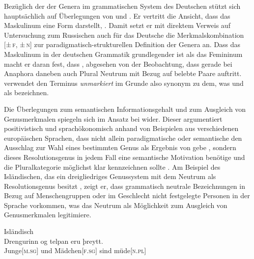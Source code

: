 \label{phsec:markiertheit}
Bezüglich der  der Genera im grammatischen
System des Deutschen stützt sich \citet{askedal1973}
hauptsächlich auf Überlegungen von \citet{jakobson1932} und
\citet{bierwisch1967}. Er vertritt die Ansicht, dass das Maskulinum eine
 Form darstellt,
. Damit setzt er mit
direktem Verweis auf  Untersuchung zum
Russischen auch für das Deutsche die Merkmalskombination
[\textsc{±\,f, ±\,n}] zur paradigmatisch-struk\-turellen
Definition der Genera an. Dass das Maskulinum in der deutschen Grammatik
grundlegender ist als das Femininum macht er daran fest, dass
, abgesehen von der Beobachtung, dass gerade
bei Anaphora daneben auch Plural Neutrum mit Bezug auf belebte
Paare auftritt. \citet{askedal1973} verwendet den Terminus \emph{unmarkiert} im
Grunde also synonym zu dem, was \citet[205--218]{corbett1991} und
\citet{wechsler2009} als  bezeichnen.

Die Überlegungen  zum semantischen Informationsgehalt
und zum Ausgleich von Genusmerkmalen spiegeln sich im Ansatz
bei \citet{corbett1991} wider. Dieser argumentiert positivistisch und
sprachökonomisch anhand von Beispielen aus verschiedenen europäischen Sprachen,
dass nicht allein paradigmatische oder semantische
 den Ausschlag zur Wahl eines bestimmten
Genus als Ergebnis von  gebe
\autocite[290--293]{corbett1991}, sondern dieses Resolutionsgenus in jedem Fall
eine semantische Motivation benötige und die
Plural\-kategorie möglichst klar kennzeichnen sollte
\autocite[293--299]{corbett1991}. Am Beispiel des Isländischen,
das ein dreigliedriges Genussystem mit dem Neutrum als
Resolutionsgenus besitzt , zeigt er,
dass grammatisch neutrale Bezeichnungen in Bezug auf Menschen\-gruppen oder im
Geschlecht nicht festgelegte Personen in der Sprache vorkommen, was das Neutrum
als Möglichkeit zum Ausgleich von Genusmerkmalen legiti\-miere.

\begin{exe}
\ex \label{ex:icelgendres}
	\langinfo%
		{Isländisch}%
		{}
		{\cites[nach][283]{corbett1991}[569]{wechsler2009}}\\
	\gll Drengurinn og telpan eru þreytt. \\
		Junge[\textsc{m.sg}] und Mädchen[\textsc{f.sg}] sind
		müde[\textsc{n.pl}] \\
	\trans {}
\end{exe}

